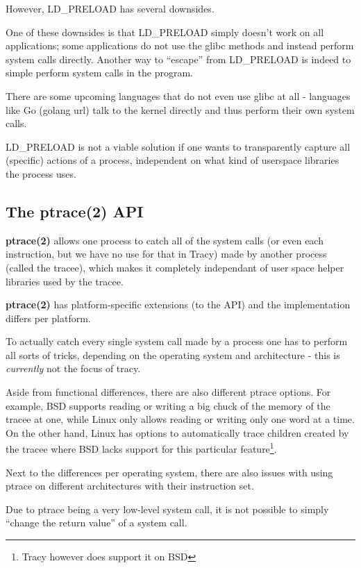 \documentclass[a4paper, twoside, 10pt, twocolumn]{report}
\begin{document}
However, LD\_PRELOAD has several downsides.

One of these downsides is that LD\_PRELOAD simply doesn't work on all
applications; some applications do not use the glibc methods and instead perform
system calls directly. Another way to ``escape'' from LD\_PRELOAD is indeed to
simple perform system calls in the program.

There are some upcoming languages that do not even use glibc at all - languages
like Go (golang url) talk to the kernel directly and thus perform their own
system calls.

LD\_PRELOAD is not a viable solution if one wants to transparently capture all
(specific) actions of a process, independent on what kind of userspace libraries
the process uses.

\subsection{The ptrace(2) API}

\textbf{ptrace(2)} allows one process to catch all of the system calls (or even
each instruction, but we have no use for that in Tracy)
made by another process (called the tracee), which makes it completely
independant of user space helper libraries used by the tracee.

\textbf{ptrace(2)} has platform-specific extensions (to the API) and the
implementation differs per platform.

To actually catch every single system call made by a process one has to
perform all sorts of tricks\cite{}, depending on the operating system and
architecture - this is \textit{currently} not the focus of tracy.

Aside from functional differences, there are also different ptrace options.
For example, BSD supports reading or writing a big chuck of the memory
of the tracee at one, while Linux only allows reading or writing only one
word at a time. On the other hand, Linux has options to automatically trace
children created by the tracee where BSD lacks support for
this particular feature\footnote{Tracy however does support it on BSD}.

Next to the differences per operating system, there are also issues with using
ptrace on different architectures with their instruction set.

Due to ptrace being a very low-level system call,
it is not possible to simply ``change the return value'' of a system call.
\end{document}
